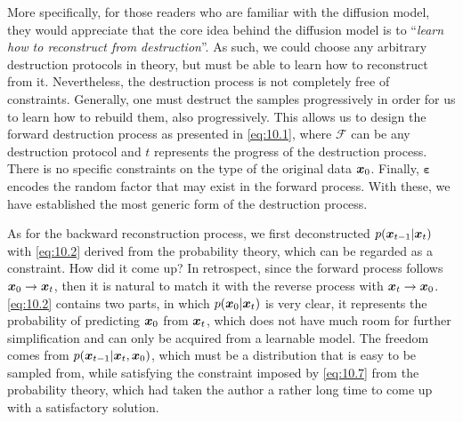 More specifically, for those readers who are familiar with the diffusion model, they would appreciate that the core idea behind the diffusion model is to ``\emph{learn how to reconstruct from destruction}''. As such, we could choose any arbitrary destruction protocols in theory, but must be able to learn how to reconstruct from it. Nevertheless, the destruction process is not completely free of constraints. Generally, one must destruct the samples progressively in order for us to learn how to rebuild them, also progressively. This allows us to design the forward destruction process as presented in \cref{eq:10.1}, where $\mathcal{F}$ can be any destruction protocol and $t$ represents the progress of the destruction process. There is no specific constraints on the type of the original data $\bm{x}_0$. Finally, $\bm{\varepsilon}$ encodes the random factor that may exist in the forward process. With these, we have established the most generic form of the destruction process.

As for the backward reconstruction process, we first deconstructed $p(\bm{x}_{t-1}|\bm{x}_{t})$ with \cref{eq:10.2} derived from the probability theory, which can be regarded as a constraint. How did it come up? In retrospect, since the forward process follows $\bm{x}_0\to\bm{x}_{t}$, then it is natural to match it with the reverse process with $\bm{x}_{t}\to\bm{x}_0$. \cref{eq:10.2} contains two parts, in which $p(\bm{x}_0|\bm{x}_{t})$ is very clear, it represents the probability of predicting $\bm{x}_0$ from $\bm{x}_{t}$, which does not have much room for further simplification and can only be acquired from a learnable model. The freedom comes from $p(\bm{x}_{t-1}|\bm{x}_{t},\bm{x}_0)$, which must be a distribution that is easy to be sampled from, while satisfying the constraint imposed by \cref{eq:10.7} from the probability theory, which had taken the author a rather long time to come up with a satisfactory solution.
